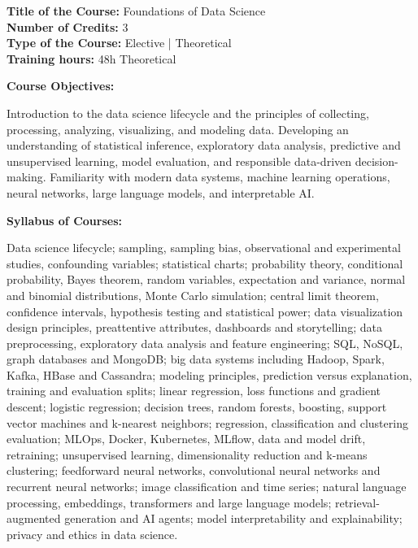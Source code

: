 \documentclass[12pt,a4paper]{article}
\begin{document}
\newpage
\textbf{Title of the Course:} Foundations of Data Science\\
\textbf{Number of Credits:} 3\\
\textbf{Type of the Course:} Elective | Theoretical\\
\textbf{Training hours:} 48h Theoretical\par\vspace{4pt}
\textbf{Course Objectives:}\par\vspace{2pt}
Introduction to the data science lifecycle and the principles of collecting, processing, analyzing, visualizing, and modeling data. Developing an understanding of statistical inference, exploratory data analysis, predictive and unsupervised learning, model evaluation, and responsible data-driven decision-making. Familiarity with modern data systems, machine learning operations, neural networks, large language models, and interpretable AI.\par\vspace{4pt}
\textbf{Syllabus of Courses:}\par\vspace{2pt}
Data science lifecycle; sampling, sampling bias, observational and experimental studies, confounding variables; statistical charts; probability theory, conditional probability, Bayes theorem, random variables, expectation and variance, normal and binomial distributions, Monte Carlo simulation; central limit theorem, confidence intervals, hypothesis testing and statistical power; data visualization design principles, preattentive attributes, dashboards and storytelling; data preprocessing, exploratory data analysis and feature engineering; SQL, NoSQL, graph databases and MongoDB; big data systems including Hadoop, Spark, Kafka, HBase and Cassandra; modeling principles, prediction versus explanation, training and evaluation splits; linear regression, loss functions and gradient descent; logistic regression; decision trees, random forests, boosting, support vector machines and k-nearest neighbors; regression, classification and clustering evaluation; MLOps, Docker, Kubernetes, MLflow, data and model drift, retraining; unsupervised learning, dimensionality reduction and k-means clustering; feedforward neural networks, convolutional neural networks and recurrent neural networks; image classification and time series; natural language processing, embeddings, transformers and large language models; retrieval-augmented generation and AI agents; model interpretability and explainability; privacy and ethics in data science.\par\vspace{4pt}
\end{document}
